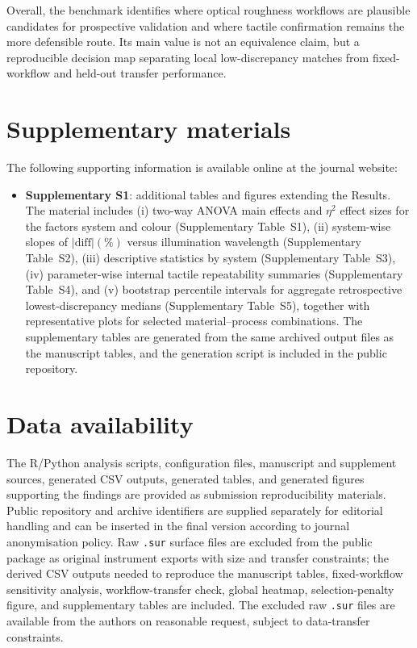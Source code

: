 \documentclass{article}
\begin{document}
Overall, the benchmark identifies where optical roughness workflows are plausible candidates for prospective validation and where tactile confirmation remains the more defensible route. Its main value is not an equivalence claim, but a reproducible decision map separating local low-discrepancy matches from fixed-workflow and held-out transfer performance.

\section*{Supplementary materials}
The following supporting information is available online at the journal website:
\begin{itemize}
	\item \textbf{Supplementary S1}: additional tables and figures extending the Results. The material includes (i) two-way ANOVA main effects and $\eta^2$ effect sizes for the factors system and colour (Supplementary Table~S1), (ii) system-wise slopes of $|\mathrm{diff}|(\%)$ versus illumination wavelength (Supplementary Table~S2), (iii) descriptive statistics by system (Supplementary Table~S3), (iv) parameter-wise internal tactile repeatability summaries (Supplementary Table~S4), and (v) bootstrap percentile intervals for aggregate retrospective lowest-discrepancy medians (Supplementary Table~S5), together with representative plots for selected material--process combinations. The supplementary tables are generated from the same archived output files as the manuscript tables, and the generation script is included in the public repository.
\end{itemize}

\section*{Data availability}
The R/Python analysis scripts, configuration files, manuscript and supplement sources, generated CSV outputs, generated tables, and generated figures supporting the findings are provided as submission reproducibility materials. Public repository and archive identifiers are supplied separately for editorial handling and can be inserted in the final version according to journal anonymisation policy. Raw \texttt{.sur} surface files are excluded from the public package as original instrument exports with size and transfer constraints; the derived CSV outputs needed to reproduce the manuscript tables, fixed-workflow sensitivity analysis, workflow-transfer check, global heatmap, selection-penalty figure, and supplementary tables are included. The excluded raw \texttt{.sur} files are available from the authors on reasonable request, subject to data-transfer constraints.

%


\end{document}
